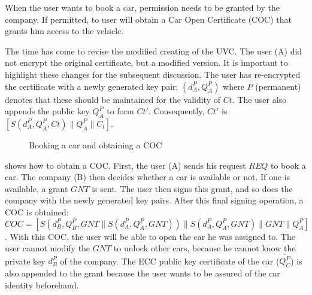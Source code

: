 When the user wants to book a car, permission needs to be granted by the company. If permitted, to user will obtain a Car Open Certificate (COC) that grants him access to the vehicle.

The time has come to revise the modified creating of the UVC. The user (A) did not encrypt the original certificate, but a modified version. It is important to highlight these changes for the subsequent discussion. The user has re-encrypted the certificate with a newly generated key pair; $(d_A^P, Q_A^P)$ where $P$ (permanent) denotes that these should be maintained for the validity of $Ct$. The user also appends the public key $Q_A^P$ to form $Ct'$. Consequently, $Ct'$ is $[S(d_A^P,Q_A^P,Ct) \parallel Q_A^P \parallel C_t]$.

\begin{figure}[!ht]
  \renewcommand{\Bx}{10}
  \setcounter{CC}{0}
  \centering
  \caption{Booking a car and obtaining a COC}
  \label{ObtainCOC}
\end{figure}

 shows how to obtain a COC. First, the user (A) sends his request $REQ$ to book a car. The company (B) then decides whether a car is available or not. If one is available, a grant $GNT$ is sent. The user then signs this grant, and so does the company with the newly generated key pairs. After this final signing operation, a COC is obtained: $COC = [S(d_B^P,Q_B^P,GNT \parallel S(d_A^P,Q_A^P,GNT))\parallel S(d_A^P,Q_A^P,GNT) \parallel GNT \parallel Q_A^P]$. With this COC, the user will be able to open the car he was assigned to. The user cannot modify the $GNT$ to unlock other cars, because he cannot know the private key $d_B^P$ of the company. The ECC public key certificate of the car ($\overline{Q_C^P}$) is also appended to the grant because the user wants to be assured of the car identity beforehand.


